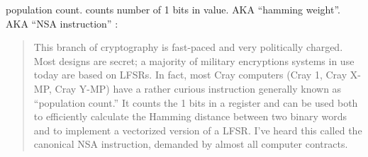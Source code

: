  \item[POPCNT] population count. 
  {counts number of 1 bits in value}.
  \ac{AKA} ``hamming weight''.
  \ac{AKA} ``NSA instruction'' :

\begin{framed}
\begin{quotation}
  This branch of cryptography is fast-paced and very politically charged.
  Most designs are secret; a majority of military encryptions systems in use today are 
  based on LFSRs. 
  In fact, most Cray computers (Cray 1, Cray X-MP, Cray Y-MP) have a rather curious 
  instruction generally known as “population count.” It counts the 1 bits in a register 
  and can be used both to efficiently calculate the Hamming distance between two binary 
  words and to implement a vectorized version of a LFSR. I’ve heard this called the canonical 
  NSA instruction, demanded by almost all computer contracts.
\end{quotation}
\end{framed}
\cite{Schneier}

